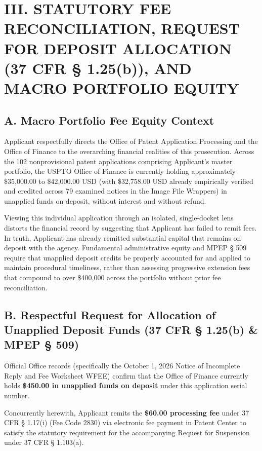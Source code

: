 \documentclass[11pt,letterpaper]{article}
\begin{document}
\section*{III. STATUTORY FEE RECONCILIATION, REQUEST FOR DEPOSIT ALLOCATION (37 CFR \S{} 1.25(b)), AND MACRO PORTFOLIO EQUITY}

\subsection*{A. Macro Portfolio Fee Equity Context}
Applicant respectfully directs the Office of Patent Application Processing and the Office of Finance to the overarching financial realities of this prosecution. Across the 102 nonprovisional patent applications comprising Applicant's master portfolio, the USPTO Office of Finance is currently holding approximately \$35,000.00 to \$42,000.00 USD (with \$32,758.00 USD already empirically verified and credited across 79 examined notices in the Image File Wrappers) in unapplied funds on deposit, without interest and without refund.

Viewing this individual application through an isolated, single-docket lens distorts the financial record by suggesting that Applicant has failed to remit fees. In truth, Applicant has already remitted substantial capital that remains on deposit with the agency. Fundamental administrative equity and MPEP \S{} 509 require that unapplied deposit credits be properly accounted for and applied to maintain procedural timeliness, rather than assessing progressive extension fees that compound to over \$400,000 across the portfolio without prior fee reconciliation.

\subsection*{B. Respectful Request for Allocation of Unapplied Deposit Funds (37 CFR \S{} 1.25(b) \& MPEP \S{} 509)}
Official Office records (specifically the October 1, 2026 Notice of Incomplete Reply and Fee Worksheet WFEE) confirm that the Office of Finance currently holds \textbf{\$450.00 in unapplied funds on deposit} under this application serial number.

Concurrently herewith, Applicant remits the \textbf{\$60.00 processing fee} under 37 CFR \S{} 1.17(i) (Fee Code 2830) via electronic fee payment in Patent Center to satisfy the statutory requirement for the accompanying Request for Suspension under 37 CFR \S{} 1.103(a).
\end{document}

